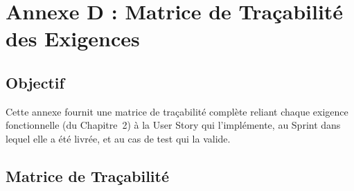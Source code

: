 \chapter{Annexe D : Matrice de Traçabilité des Exigences}

\section{Objectif}

Cette annexe fournit une matrice de traçabilité complète reliant chaque exigence
fonctionnelle (du Chapitre~2) à la User Story qui l'implémente, au Sprint dans lequel
elle a été livrée, et au cas de test qui la valide.

\section{Matrice de Traçabilité}

